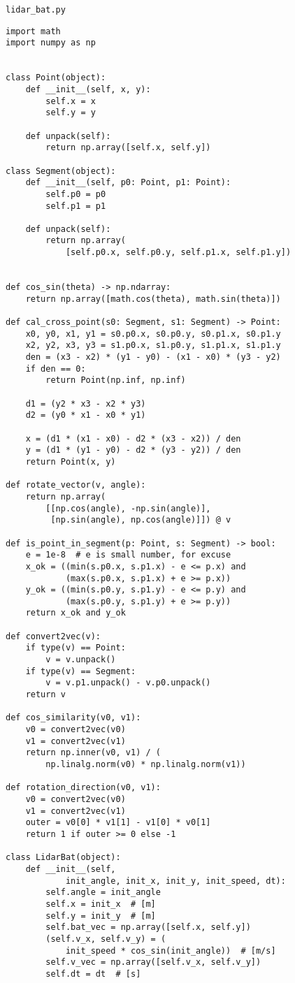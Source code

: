\documentclass[../appendix]{subfiles}
\begin{document}
\verb|lidar_bat.py|

\begin{lstlisting}[frame=single]
import math
import numpy as np


class Point(object):
    def __init__(self, x, y):
        self.x = x
        self.y = y

    def unpack(self):
        return np.array([self.x, self.y])

class Segment(object):
    def __init__(self, p0: Point, p1: Point):
        self.p0 = p0
        self.p1 = p1

    def unpack(self):
        return np.array(
            [self.p0.x, self.p0.y, self.p1.x, self.p1.y])


def cos_sin(theta) -> np.ndarray:
    return np.array([math.cos(theta), math.sin(theta)])

def cal_cross_point(s0: Segment, s1: Segment) -> Point:
    x0, y0, x1, y1 = s0.p0.x, s0.p0.y, s0.p1.x, s0.p1.y
    x2, y2, x3, y3 = s1.p0.x, s1.p0.y, s1.p1.x, s1.p1.y
    den = (x3 - x2) * (y1 - y0) - (x1 - x0) * (y3 - y2)
    if den == 0:
        return Point(np.inf, np.inf)
    
    d1 = (y2 * x3 - x2 * y3)
    d2 = (y0 * x1 - x0 * y1)

    x = (d1 * (x1 - x0) - d2 * (x3 - x2)) / den
    y = (d1 * (y1 - y0) - d2 * (y3 - y2)) / den
    return Point(x, y)

def rotate_vector(v, angle):
    return np.array(
        [[np.cos(angle), -np.sin(angle)], 
         [np.sin(angle), np.cos(angle)]]) @ v

def is_point_in_segment(p: Point, s: Segment) -> bool:
    e = 1e-8  # e is small number, for excuse 
    x_ok = ((min(s.p0.x, s.p1.x) - e <= p.x) and 
            (max(s.p0.x, s.p1.x) + e >= p.x))
    y_ok = ((min(s.p0.y, s.p1.y) - e <= p.y) and 
            (max(s.p0.y, s.p1.y) + e >= p.y))
    return x_ok and y_ok

def convert2vec(v):
    if type(v) == Point:
        v = v.unpack()
    if type(v) == Segment:
        v = v.p1.unpack() - v.p0.unpack()
    return v

def cos_similarity(v0, v1):
    v0 = convert2vec(v0)
    v1 = convert2vec(v1)
    return np.inner(v0, v1) / (
        np.linalg.norm(v0) * np.linalg.norm(v1))

def rotation_direction(v0, v1):
    v0 = convert2vec(v0)
    v1 = convert2vec(v1)
    outer = v0[0] * v1[1] - v1[0] * v0[1]
    return 1 if outer >= 0 else -1

class LidarBat(object):
    def __init__(self, 
            init_angle, init_x, init_y, init_speed, dt):
        self.angle = init_angle
        self.x = init_x  # [m]
        self.y = init_y  # [m]
        self.bat_vec = np.array([self.x, self.y])
        (self.v_x, self.v_y) = (
            init_speed * cos_sin(init_angle))  # [m/s]
        self.v_vec = np.array([self.v_x, self.v_y])
        self.dt = dt  # [s]


\end{lstlisting}
\end{document}

